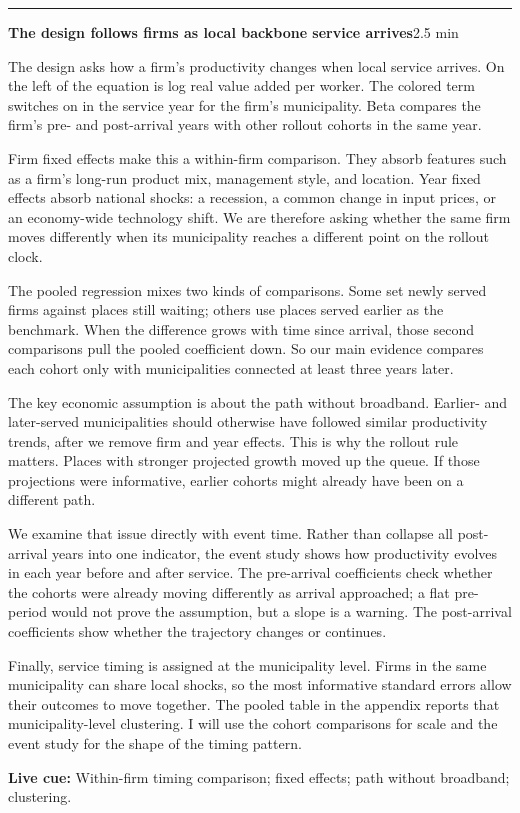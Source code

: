 \documentclass[11pt]{article}
\newcommand{\Cue}[1]{\par\nobreak\smallskip\noindent\textcolor{ScriptGray}{\footnotesize
  \textbf{Live cue:} #1}\par}
\newcommand{\scriptframe}[3]{%
  \Needspace{11\baselineskip}%
  \par\medskip\noindent\textcolor{ScriptBlue}{\rule{\linewidth}{0.55pt}}%
  \par\smallskip\noindent
  \textbf{#1}\hfill\textcolor{ScriptGray}{\small #2}\par\smallskip
  #3\par}
\begin{document}
\scriptframe{The design follows firms as local backbone service arrives}{2.5 min}{%
  The design asks how a firm's productivity changes when local service arrives.
  On the left of the equation is log real value added per worker. The colored
  term switches on in the service year for the firm's municipality. Beta
  compares the firm's pre- and post-arrival years with other rollout cohorts in
  the same year.

  Firm fixed effects make this a within-firm comparison. They absorb features
  such as a firm's long-run product mix, management style, and location. Year
  fixed effects absorb national shocks: a recession, a common change in input
  prices, or an economy-wide technology shift. We are therefore asking whether
  the same firm moves differently when its municipality reaches a different
  point on the rollout clock.

  The pooled regression mixes two kinds of comparisons. Some set newly served
  firms against places still waiting; others use places served earlier as the
  benchmark. When the difference grows with time since arrival, those second
  comparisons pull the pooled coefficient down. So our main evidence compares
  each cohort only with municipalities connected at least three years later.

  The key economic assumption is about the path without broadband. Earlier-
  and later-served municipalities should otherwise have followed similar
  productivity trends, after we remove firm and year effects. This is why the
  rollout rule matters. Places with stronger projected growth moved up the
  queue. If those projections were informative, earlier cohorts might already
  have been on a different path.

  We examine that issue directly with event time. Rather than collapse all
  post-arrival years into one indicator, the event study shows how productivity
  evolves in each year before and after service. The pre-arrival coefficients
  check whether the cohorts were already moving differently as arrival
  approached; a flat pre-period would not prove the assumption, but a slope
  is a warning. The post-arrival coefficients show whether the trajectory
  changes or continues.

  Finally, service timing is assigned at the municipality level. Firms in the
  same municipality can share local shocks, so the most informative standard
  errors allow their outcomes to move together. The pooled table in the
  appendix reports that municipality-level clustering. I will use the cohort
  comparisons for scale and the event study for the shape of the timing
  pattern.
  \Cue{Within-firm timing comparison; fixed effects; path without broadband; clustering.}
}
\end{document}
